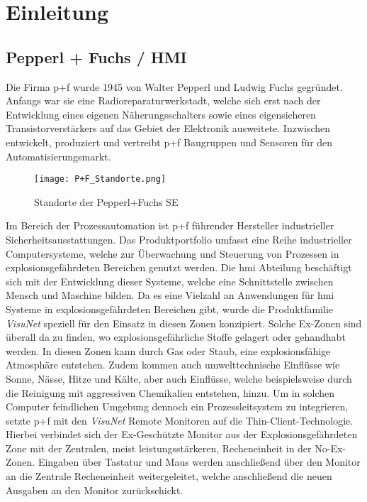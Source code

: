 \chapter{Einleitung}

\section{Pepperl + Fuchs / HMI}\label{sec:PFHMI}
Die Firma \acl{p+f} wurde 1945 von Walter Pepperl und Ludwig Fuchs gegründet. Anfangs war sie eine Radioreparaturwerkstadt, welche sich erst nach der Entwicklung eines eigenen Näherungsschalters sowie eines eigensicheren Transistorverstärkers auf das Gebiet der Elektronik ausweitete. Inzwischen entwickelt, produziert und vertreibt \ac{p+f} Baugruppen und Sensoren für den Automatisierungsmarkt. \cite{PFGeschichte}\\
\vspace{-1cm}
\begin{flushleft}
    \begin{figure}[h!]
        \centering
        \texttt{[image: P+F\_Standorte.png]}
        \caption{Standorte der Pepperl+Fuchs SE}
        \label{fig:StandortePF}
    \end{figure}
\end{flushleft}
Im Bereich der Prozessautomation ist \ac*{p+f} führender Hersteller industrieller Sicherheitsausstattungen. Das Produktportfolio umfasst eine Reihe industrieller Computersysteme, welche zur Überwachung und Steuerung von Prozessen in explosionsgefährdeten Bereichen genutzt werden. Die \ac{hmi} Abteilung beschäftigt sich mit der Entwicklung dieser Systeme, welche eine Schnittstelle zwischen Mensch und Maschine bilden. Da es eine Vielzahl an Anwendungen für \ac{hmi} Systeme in explosionsgefährdeten Bereichen gibt, wurde die Produktfamilie \textit{VisuNet} speziell für den Einsatz in diesen Zonen konzipiert. 
Solche Ex-Zonen sind überall da zu finden, wo explosionsgefährliche Stoffe gelagert oder gehandhabt werden. In diesen Zonen kann durch Gas oder Staub, eine explosionsfähige Atmosphäre entstehen. Zudem kommen auch umwelttechnische Einflüsse wie Sonne, Nässe, Hitze und Kälte, aber auch Einflüsse, welche beispielsweise durch die Reinigung mit aggressiven Chemikalien entstehen, hinzu. 
Um in solchen Computer feindlichen Umgebung dennoch ein Prozessleitsystem zu integrieren, setzte \ac{p+f} mit den \textit{VisuNet} Remote Monitoren auf die Thin-Client-Technologie. Hierbei verbindet sich der Ex-Geschützte Monitor aus der Explosionsgefährdeten Zone mit der Zentralen, meist leistungsstärkeren, Recheneinheit in der No-Ex-Zonen. Eingaben über Tastatur und Maus werden anschließend über den Monitor an die Zentrale Recheneinheit weitergeleitet, welche anschließend die neuen Ausgaben an den Monitor zurückschickt. \cite{HMIYannick}

